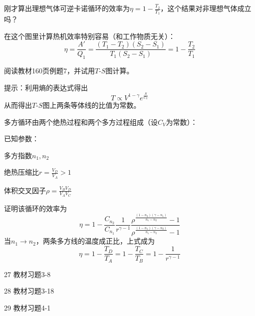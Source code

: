 \documentclass[CJK]{beamer}
\begin{document}
\begin{frame}
\bch
刚才算出理想气体可逆卡诺循环的效率为$\eta = 1-\frac{T_2}{T_1}$，这个结果对非理想气体成立吗？
\ech
\end{frame}

\begin{frame}
\bch
{}

在这个图里计算热机效率特别容易（和工作物质无关）：
$$\eta = \frac{A'}{Q_1} = \frac{(T_1-T_2)(S_2-S_1)}{T_1(S_2-S_1)} = 1- \frac{T_2}{T_1}$$

\ech
\end{frame}




\begin{frame}
\bch

阅读教材160页例题7，并试用$T$-$S$图计算。

\skiplines

{\small
提示：利用熵的表达式得出
$$ T \propto V^{1-\gamma} e^\frac{S}{C_V}$$
从而得出$T$-$S$图上两条等体线的比值为常数。
}
\ech
\end{frame}

\begin{frame}
\bch
{\small
多方循环由两个绝热过程和两个多方过程组成（设$C_V$为常数）：}
\emini
{}
{\small
已知参数：
\bitem
\item{多方指数$n_1, n_2$}
\item{绝热压缩比$r=\frac{V_D}{V_A}>1$}
\item{体积交叉因子$\rho =\frac{V_BV_D}{V_AV_C}$}
\eitem
}
\emini

{\small

证明该循环的效率为
$$\eta = 1 - \frac{C_{n_2}}{C_{n_1}}\frac{1}{r^{\gamma-1}}\frac{\rho^{\frac{(1-n_2)(\gamma-n_1)}{n_1-n_2}}-1}{\rho^{\frac{(1-n_1)(\gamma-n_2)}{n_1-n_2}}-1} $$
当$n_1\rightarrow n_2$，两条多方线的温度成正比，上式成为
$$\eta = 1-\frac{T_D}{T_A} = 1- \frac{T_C}{T_B} = 1- \frac{1}{r^{\gamma-1}}$$
}

\ech
\end{frame}



\begin{frame}
\bch
\bitem
\item[27]{教材习题3-8}
\item[28]{教材习题3-18}
\item[29]{教材习题4-1}
\eitem

\ech
\end{frame}
\end{document}
